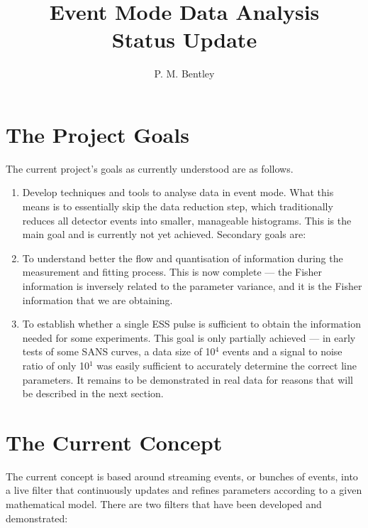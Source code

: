 \documentclass{article}
\author{P. M. Bentley}
\title{Event Mode Data Analysis \\ Status Update}
\begin{document}
\maketitle


\section{The Project Goals}

The current project's goals as currently understood are as follows.
\begin{enumerate}
  \item Develop techniques and tools to analyse data in event mode.
    What this means is to essentially skip the data reduction step,
    which traditionally reduces all detector events into smaller,
    manageable histograms.  This is the main goal and is currently not
    yet achieved.  Secondary goals are:
  \item To understand better the flow and quantisation of information
    during the measurement and fitting process.  This is now complete
    --- the Fisher information is inversely related to the parameter
    variance, and it is the Fisher information that we are obtaining.
  \item To establish whether a single ESS pulse is sufficient to
    obtain the information needed for some experiments.  This goal is
    only partially achieved --- in early tests of some SANS curves, a
    data size of 10$^4$ events and a signal to noise ratio of only
    10$^{1}$ was easily sufficient to accurately determine the correct
    line parameters.  It remains to be demonstrated in real data for
    reasons that will be described in the next section.
\end{enumerate}

\section{The Current Concept}

The current concept is based around streaming events, or bunches of
events, into a live filter that continuously updates and refines
parameters according to a given mathematical model.  There are two
filters that have been developed and demonstrated:
\end{document}
